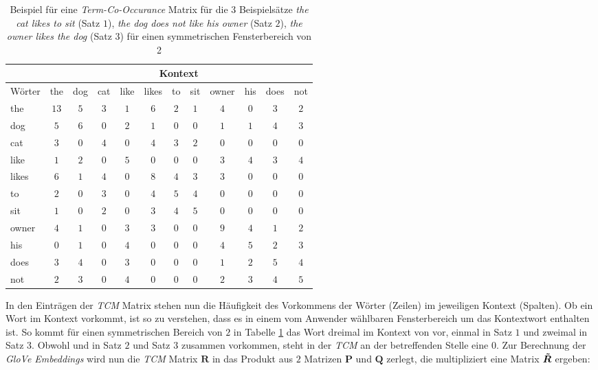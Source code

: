 \documentclass[a4paper,11pt]{article}
\begin{document}
\begin{table}[ht]
\begin{center}
  
 \begin{tabular}{|l||ccccccccccc|}
  \hline
  & \multicolumn{11}{|c|}{Kontext} \\
\hline 
Wörter & the & dog & cat & like & likes & to & sit & owner & his & does & not \\ 
  \hline
the & $13$ & $5$ & $3$ & $1$ & $6$ & $2$ & $1$ & $4$ & $0$ & $3$ & $2$ \\ 
  dog & $5$ & $6$ & $0$ & $2$ & $1$ & $0$ & $0$ & $1$ & $1$ & $4$ & $3$ \\ 
  cat & $3$ & $0$ & $4$ & $0$ & $4$ & $3$ & $2$ & $0$ & $0$ & $0$ & $0$ \\ 
  like & $1$ & $2$ & $0$ & $5$ & $0$ & $0$ & $0$ & $3$ & $4$ & $3$ & $4$ \\ 
  likes & $6$ & $1$ & $4$ & $0$ & $8$ & $4$ & $3$ & $3$ & $0$ & $0$ & $0$ \\ 
  to & $2$ & $0$ & $3$ & $0$ & $4$ & $5$ & $4$ & $0$ & $0$ & $0$ & $0$ \\ 
  sit & $1$ & $0$ & $2$ & $0$ & $3$ & $4$ & $5$ & $0$ & $0$ & $0$ & $0$ \\ 
  owner & $4$ & $1$ & $0$ & $3$ & $3$ & $0$ & $0$ & $9$ & $4$ & $1$ & $2$ \\ 
  his & $0$ & $1$ & $0$ & $4$ & $0$ & $0$ & $0$ & $4$ & $5$ & $2$ & $3$ \\ 
  does & $3$ & $4$ & $0$ & $3$ & $0$ & $0$ & $0$ & $1$ & $2$ & $5$ & $4$ \\ 
  not & $2$ & $3$ & $0$ & $4$ & $0$ & $0$ & $0$ & $2$ & $3$ & $4$ & $5$ \\ 
   \hline
\end{tabular}  
 
\end{center}{}
\caption{Beispiel für eine \textit{Term-Co-Occurance} Matrix für die $3$ Beispielsätze \textit{the cat likes to sit} (Satz $1$), \textit{the dog does not like his owner} (Satz $2$), \textit{the owner likes the dog} (Satz $3$) für einen symmetrischen Fensterbereich von 2}  
\label{tab:GloveExample}

\end{table}

In den Einträgen der \textit{TCM} Matrix stehen nun die Häufigkeit des Vorkommens der Wörter (Zeilen) im jeweiligen Kontext (Spalten). Ob ein Wort im Kontext vorkommt, ist so zu verstehen, dass es in einem vom Anwender wählbaren Fensterbereich um das Kontextwort enthalten ist. So kommt für einen symmetrischen Bereich von $2$ in Tabelle \ref{tab:GloveExample} das Wort  dreimal im Kontext von  vor, einmal in Satz $1$ und zweimal in Satz $3$. Obwohl  und  in Satz $2$ und Satz $3$ zusammen vorkommen, steht in der \textit{TCM} an der betreffenden Stelle eine $0$. Zur Berechnung der \textit{GloVe Embeddings} wird nun die \textit{TCM} Matrix $\bm{R}$ in das Produkt aus $2$ Matrizen $\bm{P}$ und $\bm{Q}$ zerlegt, die multipliziert eine Matrix $\bm{\Tilde{R}}$ ergeben:
\end{document}
